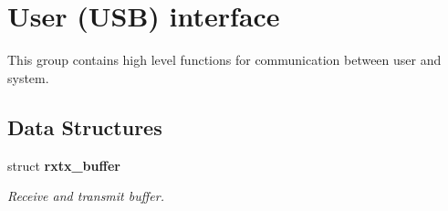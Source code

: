 \hypertarget{group__user__interface}{
\section{\-User (\-U\-S\-B) interface}
\label{group__user__interface}
}


\-This group contains high level functions for communication between user and system.  


\subsection*{\-Data \-Structures}
\begin{DoxyCompactItemize}
\item 
struct {\bfseries rxtx\-\_\-buffer}
\begin{DoxyCompactList}\small\item\em \-Receive and transmit buffer. \end{DoxyCompactList}\end{DoxyCompactItemize}
